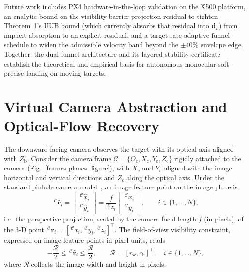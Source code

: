 \documentclass{IEEEtaes}
\begin{document}
Future work includes PX4 hardware-in-the-loop validation on the X500 platform, an analytic bound on the visibility-barrier projection residual to tighten Theorem~1's UUB bound (which currently absorbs that residual into $\boldsymbol{d}_h$) from implicit absorption to an explicit residual, and a target-rate-adaptive funnel schedule to widen the admissible velocity band beyond the $\pm 40\%$ envelope edge. Together, the dual-funnel architecture and its layered stability certificate establish the theoretical and empirical basis for autonomous monocular soft-precise landing on moving targets.

\appendices
\section{Virtual Camera Abstraction and Optical-Flow Recovery} \label{virtual camera: section}
The downward-facing camera observes the target with its optical axis aligned with $Z_\text{b}$. Consider the camera frame $\mathcal{C}=\{O_{\text{c}},X_{\text{c}},Y_{\text{c}},Z_{\text{c}}\}$ rigidly attached to the camera (Fig.~\ref{frames planes: figure}), with $X_{\text{c}}$ and $Y_{\text{c}}$ aligned with the image horizontal and vertical directions and $Z_{\text{c}}$ along the optical axis. Under the standard pinhole camera model~\cite{chaumette2006}, an image feature point on the image plane is
\begin{equation}
\label{pinhole camera model: equation}
    \,^\mathcal{C}\hat{\boldsymbol{r}}_i = \begin{bmatrix} \,^\mathcal{C}\hat{x}_i \\ \,^\mathcal{C}\hat{y}_i \end{bmatrix}
    = \frac{f}{\,^\mathcal{C}z_i}\begin{bmatrix} \,^\mathcal{C}x_i \\ \,^\mathcal{C}y_i \end{bmatrix},\qquad i\in\{1,\ldots,N\},
\end{equation}
i.e.\ the perspective projection, scaled by the camera focal length $f$ (in pixels), of the 3-D point $\,^\mathcal{C}\boldsymbol{r}_i=[\,^\mathcal{C}x_i,\,^\mathcal{C}y_i,\,^\mathcal{C}z_i]^{\top}$. The field-of-view visibility constraint, expressed on image feature points in pixel units, reads
\begin{equation} \label{visibility constraint: equation}
    -\frac{\mathcal{R}}{2} \le \,^\mathcal{C}\hat{\boldsymbol{r}}_i \le \frac{\mathcal{R}}{2},\qquad \mathcal{R}=[r_\text{w},r_\text{h}]^\top,\quad i\in\{1,\ldots,N\},
\end{equation}
where $\mathcal{R}$ collects the image width and height in pixels.
\end{document}
